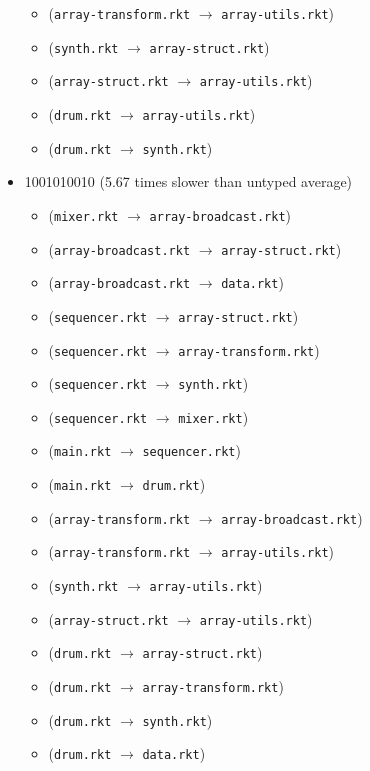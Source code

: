 \documentclass{article}
\newcommand{\mono}[1]{\texttt{#1}}
\begin{document}
\begin{itemize}
\begin{itemize}
  \item (\mono{array-transform.rkt} $\rightarrow$ \mono{array-utils.rkt})
  \item (\mono{synth.rkt} $\rightarrow$ \mono{array-struct.rkt})
  \item (\mono{array-struct.rkt} $\rightarrow$ \mono{array-utils.rkt})
  \item (\mono{drum.rkt} $\rightarrow$ \mono{array-utils.rkt})
  \item (\mono{drum.rkt} $\rightarrow$ \mono{synth.rkt})
  \end{itemize}
\item 1001010010 (5.67 times slower than untyped average)
  \begin{itemize}
  \item (\mono{mixer.rkt} $\rightarrow$ \mono{array-broadcast.rkt})
  \item (\mono{array-broadcast.rkt} $\rightarrow$ \mono{array-struct.rkt})
  \item (\mono{array-broadcast.rkt} $\rightarrow$ \mono{data.rkt})
  \item (\mono{sequencer.rkt} $\rightarrow$ \mono{array-struct.rkt})
  \item (\mono{sequencer.rkt} $\rightarrow$ \mono{array-transform.rkt})
  \item (\mono{sequencer.rkt} $\rightarrow$ \mono{synth.rkt})
  \item (\mono{sequencer.rkt} $\rightarrow$ \mono{mixer.rkt})
  \item (\mono{main.rkt} $\rightarrow$ \mono{sequencer.rkt})
  \item (\mono{main.rkt} $\rightarrow$ \mono{drum.rkt})
  \item (\mono{array-transform.rkt} $\rightarrow$ \mono{array-broadcast.rkt})
  \item (\mono{array-transform.rkt} $\rightarrow$ \mono{array-utils.rkt})
  \item (\mono{synth.rkt} $\rightarrow$ \mono{array-utils.rkt})
  \item (\mono{array-struct.rkt} $\rightarrow$ \mono{array-utils.rkt})
  \item (\mono{drum.rkt} $\rightarrow$ \mono{array-struct.rkt})
  \item (\mono{drum.rkt} $\rightarrow$ \mono{array-transform.rkt})
  \item (\mono{drum.rkt} $\rightarrow$ \mono{synth.rkt})
  \item (\mono{drum.rkt} $\rightarrow$ \mono{data.rkt})
  \end{itemize}

\end{itemize}
\end{document}
